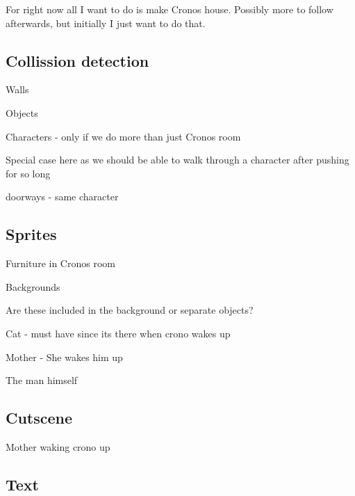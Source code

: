 For right now all I want to do is make Crono\textquotesingle{}s house. Possibly more to follow afterwards, but initially I just want to do that.

\subsection*{Collission detection}


\begin{DoxyItemize}
\item Walls
\item Objects
\item Characters -\/ only if we do more than just Crono\textquotesingle{}s room
\begin{DoxyItemize}
\item Special case here as we should be able to walk through a character after pushing for so long
\item doorways -\/ same character
\end{DoxyItemize}
\end{DoxyItemize}

\subsection*{Sprites}


\begin{DoxyItemize}
\item Furniture in Crono\textquotesingle{}s room
\item Backgrounds
\begin{DoxyItemize}
\item Are these included in the background or separate objects?
\end{DoxyItemize}
\item Cat -\/ must have since it\textquotesingle{}s there when crono wakes up
\item Mother -\/ She wakes him up
\item The man himself
\end{DoxyItemize}

\subsection*{Cutscene}


\begin{DoxyItemize}
\item Mother waking crono up \subsection*{Text}
\end{DoxyItemize}


